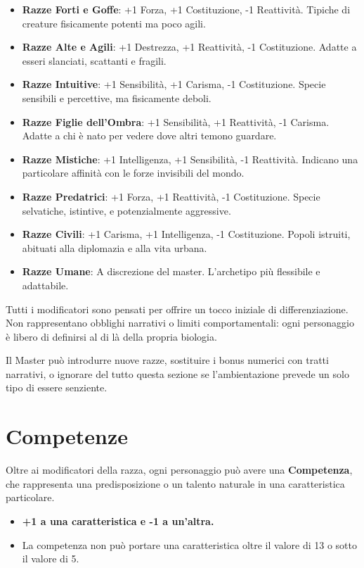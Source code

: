 \documentclass[../manuale_main.tex]{subfiles}
\begin{document}
\begin{itemize}
  \item \textbf{Razze Forti e Goffe}: +1 Forza, +1 Costituzione, -1 Reattività. Tipiche di creature fisicamente potenti ma poco agili.
  \item \textbf{Razze Alte e Agili}: +1 Destrezza, +1 Reattività, -1 Costituzione. Adatte a esseri slanciati, scattanti e fragili.
  \item \textbf{Razze Intuitive}: +1 Sensibilità, +1 Carisma, -1 Costituzione. Specie sensibili e percettive, ma fisicamente deboli.
  \item \textbf{Razze Figlie dell’Ombra}: +1 Sensibilità, +1 Reattività, -1 Carisma. Adatte a chi è nato per vedere dove altri temono guardare.
  \item \textbf{Razze Mistiche}: +1 Intelligenza, +1 Sensibilità, -1 Reattività. Indicano una particolare affinità con le forze invisibili del mondo.
  \item \textbf{Razze Predatrici}: +1 Forza, +1 Reattività, -1 Costituzione. Specie selvatiche, istintive, e potenzialmente aggressive.
  \item \textbf{Razze Civili}: +1 Carisma, +1 Intelligenza, -1 Costituzione. Popoli istruiti, abituati alla diplomazia e alla vita urbana.
  \item \textbf{Razze Umane}: A discrezione del master. L’archetipo più flessibile e adattabile.
\end{itemize}

\medskip
Tutti i modificatori sono pensati per offrire un tocco iniziale di differenziazione. Non rappresentano obblighi narrativi o limiti comportamentali: ogni personaggio è libero di definirsi al di là della propria biologia.

\medskip
Il Master può introdurre nuove razze, sostituire i bonus numerici con tratti narrativi, o ignorare del tutto questa sezione se l’ambientazione prevede un solo tipo di essere senziente.

\vspace{0.3cm}

\section{Competenze}
Oltre ai modificatori della razza, ogni personaggio può avere una \textbf{Competenza}, che rappresenta una predisposizione o un talento naturale in una caratteristica particolare. 

\begin{itemize}
    \item \textbf{+1 a una caratteristica e -1 a un’altra.}
    \item La competenza non può portare una caratteristica oltre il valore di 13 o sotto il valore di 5.
\end{itemize}
\end{document}
